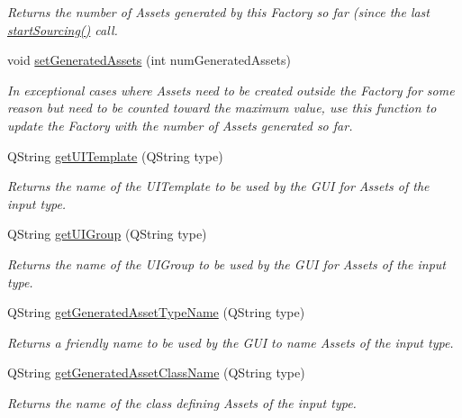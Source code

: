 \begin{DoxyCompactItemize}
\begin{DoxyCompactList}\small\item\em Returns the number of Assets generated by this Factory so far (since the last \hyperlink{class_picto_1_1_asset_factory_a32c8377f0613a103f295470fb8b8aa8e}{start\-Sourcing()} call. \end{DoxyCompactList}\item 
\hypertarget{class_picto_1_1_asset_factory_a6d9302135b0c04c6f03f124fd5d7370b}{void \hyperlink{class_picto_1_1_asset_factory_a6d9302135b0c04c6f03f124fd5d7370b}{set\-Generated\-Assets} (int num\-Generated\-Assets)}\label{class_picto_1_1_asset_factory_a6d9302135b0c04c6f03f124fd5d7370b}

\begin{DoxyCompactList}\small\item\em In exceptional cases where Assets need to be created outside the Factory for some reason but need to be counted toward the maximum value, use this function to update the Factory with the number of Assets generated so far. \end{DoxyCompactList}\item 
Q\-String \hyperlink{class_picto_1_1_asset_factory_a2ac6a0fac82136009c1c39898ef03eea}{get\-U\-I\-Template} (Q\-String type)
\begin{DoxyCompactList}\small\item\em Returns the name of the U\-I\-Template to be used by the G\-U\-I for Assets of the input type. \end{DoxyCompactList}\item 
Q\-String \hyperlink{class_picto_1_1_asset_factory_ae5664246cf0c06c1355c55d47e0fd394}{get\-U\-I\-Group} (Q\-String type)
\begin{DoxyCompactList}\small\item\em Returns the name of the U\-I\-Group to be used by the G\-U\-I for Assets of the input type. \end{DoxyCompactList}\item 
Q\-String \hyperlink{class_picto_1_1_asset_factory_a5b3e947b5c7e59dad7403610bcdf779d}{get\-Generated\-Asset\-Type\-Name} (Q\-String type)
\begin{DoxyCompactList}\small\item\em Returns a friendly name to be used by the G\-U\-I to name Assets of the input type. \end{DoxyCompactList}\item 
Q\-String \hyperlink{class_picto_1_1_asset_factory_a5c7d6ec507ef05b863a951c24191289e}{get\-Generated\-Asset\-Class\-Name} (Q\-String type)
\begin{DoxyCompactList}\small\item\em Returns the name of the class defining Assets of the input type. \end{DoxyCompactList}\end{DoxyCompactItemize}
